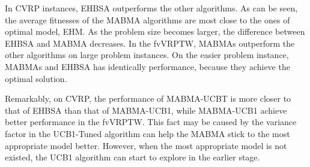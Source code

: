 In CVRP instances, EHBSA outperforms the other algorithms. As can be seen, the average fitnesses of the MABMA algorithms are most close to the ones of optimal model, EHM. As the problem size becomes larger, the difference between EHBSA and MABMA decreases. In the fvVRPTW, MABMAs outperform the other algorithms on large problem instances. On the easier problem instance, MABMAs and EHBSA has identically performance, because they achieve the optimal solution.

Remarkably, on CVRP, the performance of MABMA-UCBT is more closer to that of EHBSA than that of MABMA-UCB1, while MABMA-UCB1 achieve better performance in the fvVRPTW. This fact may be caused by the variance factor in the UCB1-Tuned algorithm can help the MABMA stick to the most appropriate model better. However, when the most appropriate model is not existed, the UCB1 algorithm can start to explore in the earlier stage.


